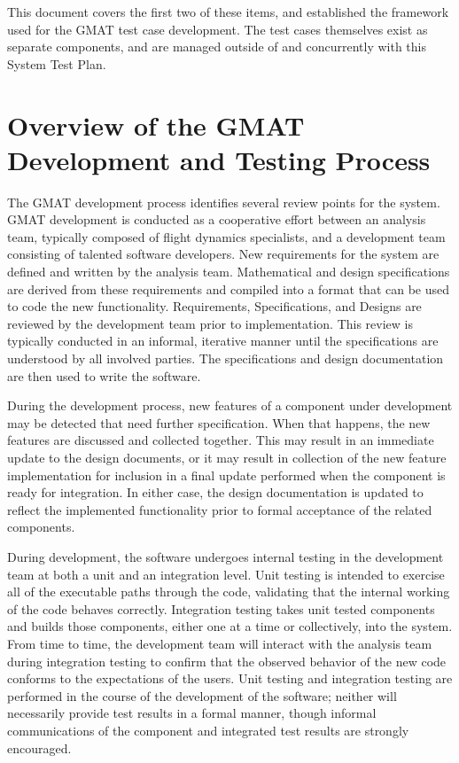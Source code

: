 This document covers the first two of these items, and established the framework used for the GMAT
test case development.  The test cases themselves exist as separate components, and are managed
outside of and concurrently with this System Test Plan.

\section{Overview of the GMAT Development and Testing Process}

The GMAT development process identifies several review points for the system.  GMAT development is
conducted as a cooperative effort between an analysis team, typically composed of flight dynamics
specialists, and a development team consisting of talented software developers.  New requirements
for the system are defined and written by the analysis team.  Mathematical and design specifications
are derived from these requirements and compiled into a format that can be used to code the new
functionality.  Requirements, Specifications, and Designs are reviewed by the development team prior
to implementation.  This review is typically conducted in an informal, iterative manner until the
specifications are understood by all involved parties.  The specifications and design documentation
are then used to write the software.

During the development process, new features of a component under development may be detected that
need further specification.  When that happens, the new features are discussed and collected
together.  This may result in an immediate update to the design documents, or it may result in
collection of the new feature implementation for inclusion in a final update performed when the
component is ready for integration.  In either case, the design documentation is updated to reflect
the implemented functionality prior to formal acceptance of the related components.

During development, the software undergoes internal testing in the development team at both a unit
and an integration level.  Unit testing is intended to exercise all of the executable paths through
the code, validating that the internal working of the code behaves correctly.  Integration testing
takes unit tested components and builds those components, either one at a time or collectively, into
the system.  From time to time, the development team will interact with the analysis team during
integration testing to confirm that the observed behavior of the new code conforms to the
expectations of the users.  Unit testing and integration testing are performed in the course of the
development of the software; neither will necessarily provide test results in a formal manner,
though informal communications of the component and integrated test results are strongly encouraged.

